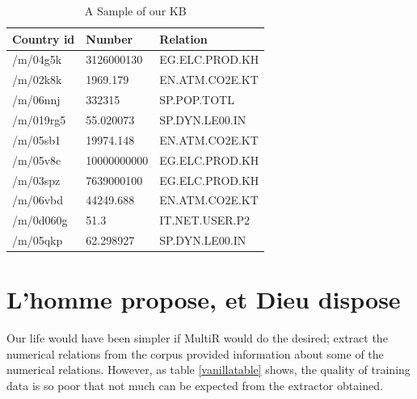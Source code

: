 \documentclass[a4paper,10pt]{article}
\begin{document}
\begin{table}[H]
\centering
\begin{tabular}{|l|l|l|}
\hline
Country id & Number & Relation \\
\hline
/m/04g5k&3126000130&EG.ELC.PROD.KH\\
/m/02k8k&1969.179&EN.ATM.CO2E.KT\\
/m/06nnj&332315&SP.POP.TOTL\\
/m/019rg5&55.020073&SP.DYN.LE00.IN\\
/m/05sb1&19974.148&EN.ATM.CO2E.KT\\
/m/05v8c&10000000000&EG.ELC.PROD.KH\\
/m/03spz&7639000100&EG.ELC.PROD.KH\\
/m/06vbd&44249.688&EN.ATM.CO2E.KT\\
/m/0d060g&51.3&IT.NET.USER.P2\\
/m/05qkp&62.298927&SP.DYN.LE00.IN\\
\hline
\end{tabular}
\caption{A Sample of our KB}
\label{fig:kb}
\end{table}


\section{L'homme propose, et Dieu dispose}
Our life would have been simpler if MultiR would do the desired; extract the numerical relations from the corpus provided
information about some of the numerical relations. However, as table \ref{vanillatable} shows, the quality of training data
is so poor that not much can be expected from the extractor obtained.

\begin{center}
\begin{table}[H]

\caption{Vanilla Match}
\label{vanillatable}
\end{table}
\end{center}
\end{document}
